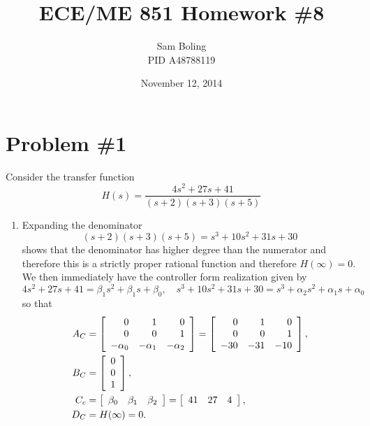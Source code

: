 \documentclass{article}
\title{ECE/ME 851 Homework \#8}
\date{November 12, 2014}
\author{Sam Boling \\ PID A48788119}
\begin{document}
\maketitle

\section*{Problem \#1}
Consider the transfer function
$$
H(s) = \frac{4s^2 + 27s + 41}{(s+2)(s+3)(s+5)}
$$

\begin{enumerate}
  \item{
    Expanding the denominator
    $$
    (s+2)(s+3)(s+5) = s^3 + 10s^2 + 31s + 30
    $$
    shows that the denominator has higher degree than the numerator
    and therefore this is a strictly proper rational function and
    therefore $H(\infty) = 0$. We then immediately have the controller
    form realization given by
    $$
    4s^2 + 27s + 41 = \beta_{1} s^2 + \beta_{1} s + \beta_{0}, \quad
    s^3 + 10s^2 + 31s + 30 = s^3 + \alpha_{2} s^2 + \alpha_{1} s + \alpha_0
    $$
    so that
    \begin{align*}
    A_C &=
    \left[\begin{array}{r r r}
       0         & 1           & 0          \\
       0         & 0           & 1          \\
      -\alpha_{0} & -\alpha_{1} & -\alpha_{2}
    \end{array}\right] =
    \left[\begin{array}{r r r}
       0  & 1   & 0   \\
       0  & 0   & 1   \\
      -30 & -31 & -10
    \end{array}\right], \\
    B_C &=
    \left[\begin{array}{r r r}
       0 \\
       0 \\
       1
    \end{array}\right], \\
    C_c &=
    \left[\begin{array}{r r r}
      \beta_{0} & \beta_{1} & \beta_{2}
    \end{array}\right] =
    \left[\begin{array}{r r r}
      41 & 27 & 4
    \end{array}\right], \\
    D_C &= H(\infty) = 0.
    \end{align*}
}
\end{enumerate}
\end{document}
